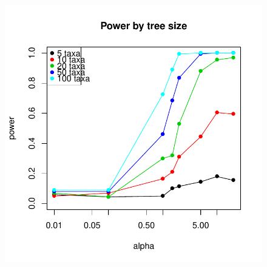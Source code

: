 \documentclass{elsarticle}
\makeatletter
\newenvironment{kframe}{%
 \def\FrameCommand##1{\hskip\@totalleftmargin \hskip-\fboxsep
 \colorbox{shadecolor}{##1}\hskip-\fboxsep
     \hskip-\linewidth \hskip-\@totalleftmargin \hskip\columnwidth}%
 \MakeFramed {\advance\hsize-\width
   \@totalleftmargin\z@ \linewidth\hsize
   \@setminipage}}%
 {\par\unskip\endMakeFramed}
\newenvironment{knitrout}{}{} %
\makeatother
\begin{document}
\begin{figure}
\begin{center}
\begin{knitrout}
\begin{kframe}
{\centering \includegraphics{Fig6a} 

}

\end{kframe}
\end{knitrout}

\end{center}
\caption{}
\label{fig:sixa}
\end{figure}
\end{document}
